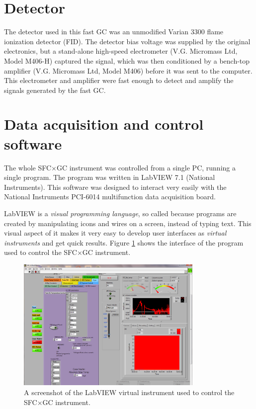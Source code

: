 \section{Detector}

The detector used in this fast GC was an unmodified Varian\texttrademark{} 3300
flame ionization detector (FID). The detector bias voltage was supplied by the
original electronics, but a stand-alone high-speed electrometer (V.G. Micromass
Ltd, Model M406-H) captured the signal, which was then conditioned by a
bench-top amplifier (V.G. Micromass Ltd, Model M406) before it was sent to the
computer. This electrometer and amplifier were fast enough to detect and amplify
the signals generated by the fast GC.

\section{Data acquisition and control software}

The whole SFC×GC instrument was controlled from a single PC, running a single
program. The program was written in LabVIEW 7.1\texttrademark{} (National
Instruments). This software was designed to interact very easily with the
National Instruments PCI-6014 multifunction data acquisition board.

LabVIEW is a \textit{visual programming language}, so called because programs
are created by manipulating icons and wires on a screen, instead of typing text.
This visual aspect of it makes it very easy to develop user interfaces as
\textit{virtual instruments} and get quick results. Figure \ref{fig:SFCGCFastVI}
shows the interface of the program used to control the SFC×GC instrument.

\begin{figure}
	\centering
	\includegraphics[width=0.8\textwidth]{./Figures/Screenshot.png}
	\decoRule
	
	\caption[The main LabVIEW VI]{A screenshot of the LabVIEW virtual instrument
	used to control the SFC×GC instrument.}
	
	\label{fig:SFCGCFastVI}
\end{figure}


